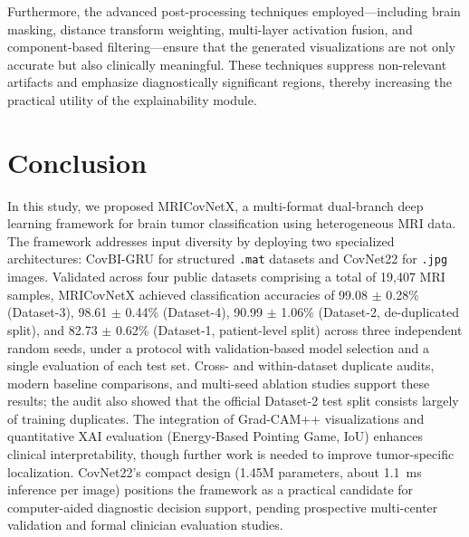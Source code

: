 \documentclass[a4paper,fleqn]{cas-sc}
\begin{document}
Furthermore, the advanced post-processing techniques employed—including brain masking, distance transform weighting, multi-layer activation fusion, and component-based filtering—ensure that the generated visualizations are not only accurate but also clinically meaningful. These techniques suppress non-relevant artifacts and emphasize diagnostically significant regions, thereby increasing the practical utility of the explainability module.

\section{Conclusion} \label{sec6}

In this study, we proposed MRICovNetX, a multi-format dual-branch deep learning framework for brain tumor classification using heterogeneous MRI data. The framework addresses input diversity by deploying two specialized architectures: CovBI-GRU for structured \texttt{.mat} datasets and CovNet22 for \texttt{.jpg} images. Validated across four public datasets comprising a total of 19,407 MRI samples, MRICovNetX achieved classification accuracies of 99.08 $\pm$ 0.28\% (Dataset-3), 98.61 $\pm$ 0.44\% (Dataset-4), 90.99 $\pm$ 1.06\% (Dataset-2, de-duplicated split), and 82.73 $\pm$ 0.62\% (Dataset-1, patient-level split) across three independent random seeds, under a protocol with validation-based model selection and a single evaluation of each test set. Cross- and within-dataset duplicate audits, modern baseline comparisons, and multi-seed ablation studies support these results; the audit also showed that the official Dataset-2 test split consists largely of training duplicates. The integration of Grad-CAM++ visualizations and quantitative XAI evaluation (Energy-Based Pointing Game, IoU) enhances clinical interpretability, though further work is needed to improve tumor-specific localization. CovNet22's compact design (1.45M parameters, about 1.1~ms inference per image) positions the framework as a practical candidate for computer-aided diagnostic decision support, pending prospective multi-center validation and formal clinician evaluation studies.

\end{document}
